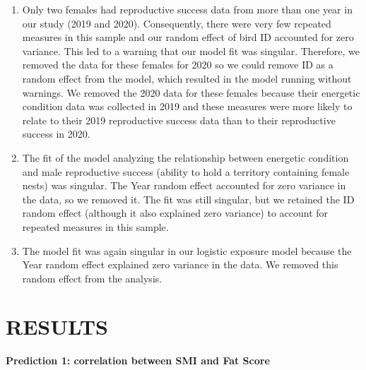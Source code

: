 \documentclass[
]{article}
\begin{document}
\begin{enumerate}
\def\labelenumi{\arabic{enumi})}
\setcounter{enumi}{5}
\item
  Only two females had reproductive success data from more than one year
  in our study (2019 and 2020). Consequently, there were very few
  repeated measures in this sample and our random effect of bird ID
  accounted for zero variance. This led to a warning that our model fit
  was singular. Therefore, we removed the data for these females for
  2020 so we could remove ID as a random effect from the model, which
  resulted in the model running without warnings. We removed the 2020
  data for these females because their energetic condition data was
  collected in 2019 and these measures were more likely to relate to
  their 2019 reproductive success data than to their reproductive
  success in 2020.
\item
  The fit of the model analyzing the relationship between energetic
  condition and male reproductive success (ability to hold a territory
  containing female nests) was singular. The Year random effect
  accounted for zero variance in the data, so we removed it. The fit was
  still singular, but we retained the ID random effect (although it also
  explained zero variance) to account for repeated measures in this
  sample.
\item
  The model fit was again singular in our logistic exposure model
  because the Year random effect explained zero variance in the data. We
  removed this random effect from the analysis.
\end{enumerate}

\hypertarget{results}{%
\section{RESULTS}\label{results}}

\textbf{Prediction 1: correlation between SMI and Fat Score}
\end{document}
